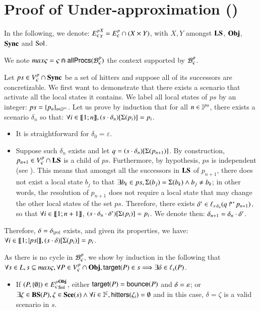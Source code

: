 \section{Proof of Under-approximation ()}
\label{suppl:demoapproxinf}


In the following, we denote:
${E_\varsigma^p}^{X}_{Y} = {E_\varsigma^p} \cap (X \times Y)$, with $X, Y$
amongst $\mathbf{LS}$, $\mathbf{Obj}$, $\mathbf{Sync}$ and $\mathrm{Sol}$.

\begin{proofapproxinf}
We note $max\varsigma = \varsigma \Cap \mathsf{allProcs}({\mathcal{B}_{\varsigma}^{p}})$ the context supported by ${\mathcal{B}_{\varsigma}^{p}}$.

Let $ps \in {V_\varsigma^p} \cap \mathbf{Sync}$ be a set of hitters
and suppose all of its successors are concretizable.
We first want to demonstrate that
there exists a scenario that activate all the local states it contains.
We label all local states of $ps$ by an integer: $ps = \{ p_n \}_{n \in \mathbb{I}^{ps}}$.
Let us prove by induction that for all $n \in \mathbb{I}^{ps}$, there exists a scenario $\delta_n$ so that:
$\forall i \in \llbracket 1; n \rrbracket, {(s \cdot \delta_n)[\Sigma(p_i)]} = p_i$.
\begin{itemize}
  \item It is straightforward for $\delta_0 = \varepsilon$.
  \item Suppose such $\delta_n$ exists and let $q = {(s \cdot \delta_n)[\Sigma(p_{n+1})]}$.
    By construction, $p_{n+1} \in {V_\varsigma^p} \cap \mathbf{LS}$ is a child of $ps$.
    Furthermore, by hypothesis, $ps$ is independent (see ).
    This means that amongst all the successors in $\mathbf{LS}$ of $p_{n+1}$,
    there does not exist a local state $b_j$ to that
    $\exists b_k \in ps, \Sigma(b_j) = \Sigma(b_k) \wedge b_j \neq b_k$;
    in other words, the resolution of $p_{n+1}$ does not require a local state
    that may change the other local states of the set $ps$.
    Therefore, there exists $\delta' \in \ell_{s \cdot \delta_n}(\mbox{$q\Rsh^*\!p_{n+1}$})$,
    so that $\forall i \in \llbracket 1; n+1 \rrbracket$, ${(s \cdot \delta_n \cdot \delta')[\Sigma(p_{i})]} = p_{i}$.
    We denote then: $\delta_{n+1} = \delta_n \cdot \delta'$.
\end{itemize}
Therefore, $\delta = \delta_{|ps|}$ exists, and given its properties, we have:
$\forall i \in \llbracket 1; |ps| \rrbracket, {(s \cdot \delta)[\Sigma(p_{i})]} = p_{i}$.

As there is no cycle in ${\mathcal{B}_{\varsigma}^{p}}$, we show by induction in the following that
$\forall s\in L, s\subseteq max\varsigma, \forall P \in {V_\varsigma^p} \cap \mathbf{Obj},
\mathsf{target}(P) \in s \Longrightarrow \exists \delta \in \ell_s(P)$.
\begin{itemize}
  \item If $(P, \{ \emptyset \}) \in {E_\varsigma^p}^{\mathbf{Obj}}_{\mathrm{Sol}}$,
    either $\mathsf{target}(P) = \mathsf{bounce}(P)$ and $\delta = \varepsilon$;
    or $\exists \zeta \in \mathbf{BS}(P), \zeta \in \mathbf{Sce}(s) \wedge
      \forall i \in \mathbb{I}^{\zeta}, \mathsf{hitters}(\zeta_i) = \emptyset$
    and in this case, $\delta = \zeta$ is a valid scenario in $s$.


\end{itemize}
\end{proofapproxinf}
